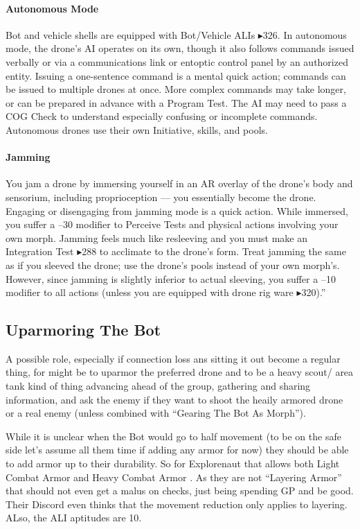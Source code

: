 \paragraph{Autonomous Mode} Bot and vehicle shells are equipped with Bot/Vehicle ALIs $\blacktriangleright$326. In autonomous mode, the drone’s AI operates on its own, though it also follows commands issued verbally or via a communications link or entoptic control panel by an authorized entity. Issuing a one-sentence command is a mental quick action; commands can be issued to multiple drones at once. More complex commands may take longer, or can be prepared in advance with a Program Test. The AI may need to pass a COG Check to understand especially confusing or incomplete commands. Autonomous drones use their own Initiative, skills, and pools.

\paragraph{Jamming} You jam a drone by immersing yourself in an AR overlay of the drone’s body and sensorium, including proprioception — you essentially become the drone. Engaging or disengaging from jamming mode is a quick action. While immersed, you suffer a –30 modifier to Perceive Tests and physical actions involving your own morph. Jamming feels much like resleeving and you must make an Integration Test $\blacktriangleright$288 to acclimate to the drone’s form. Treat jamming the same as if you sleeved the drone; use the drone's pools instead of your own morph's. However, since jamming is slightly inferior to actual sleeving, you suffer a –10 modifier to all actions (unless you are equipped with drone rig ware $\blacktriangleright$320).” \citep[pg. 346]{ep2e_1.1_2019}

\subsection{Uparmoring The Bot}

A possible role, especially if connection loss ans sitting it out become a regular thing, for \texttt{\egr{}}\index{\egr{}} might be to uparmor the preferred drone and to be a heavy scout/ area tank kind of thing advancing ahead of the group, gathering and sharing information, and ask the enemy if they want to shoot the heaily armored drone or a real enemy (unless combined with “Gearing The Bot As Morph”).

While it is unclear when the Bot would go to half movement (to be on the safe side let's assume all them time if adding any armor for now) they should be able to add armor up to their durability. So for Explorenaut that allows both Light Combat Armor and Heavy Combat Armor \citep[p. 215]{ep2e_1.1_2019}. As they are not “Layering Armor” that should not even get a malus on checks, just being spending GP and be good. Their Discord even thinks that the movement reduction only applies to layering. ALso, the ALI aptitudes are 10. 

